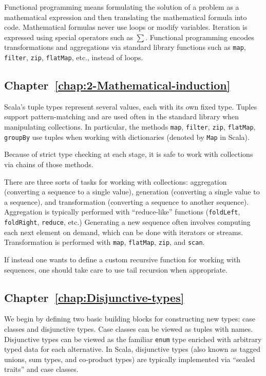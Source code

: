 Functional programming means formulating the solution of a problem
as a mathematical expression and then translating the mathematical
formula into code. Mathematical formulas never use loops or modify
variables. Iteration is expressed using special operators such as
$\sum$. Functional programming encodes transformations and aggregations
via standard library functions such as \lstinline!map!, \lstinline!filter!,
\lstinline!zip!, \lstinline!flatMap!, etc., instead of loops.

\subsection{Chapter~\ref{chap:2-Mathematical-induction}}

Scala\textsf{'}s tuple types represent several values, each with its own fixed
type. Tuples support pattern-matching and are used often in the standard
library when manipulating collections. In particular, the methods
\lstinline!map!, \lstinline!filter!, \lstinline!zip!, \lstinline!flatMap!,
\lstinline!groupBy! use tuples when working with dictionaries (denoted
by \lstinline!Map! in Scala).

Because of strict type checking at each stage, it is safe to work
with collections via chains of those methods.

There are three sorts of tasks for working with collections: aggregation
(converting a sequence to a single value), generation (converting
a single value to a sequence), and transformation (converting a sequence
to another sequence). Aggregation is typically performed with \textsf{``}reduce-like\textsf{''}
functions (\lstinline!foldLeft!, \lstinline!foldRight!, \lstinline!reduce!,
etc.) Generating a new sequence often involves computing each next
element on demand, which can be done with iterators or streams. Transformation
is performed with \lstinline!map!, \lstinline!flatMap!, \lstinline!zip!,
and \lstinline!scan!.

If instead one wants to define a custom recursive function for working
with sequences, one should take care to use tail recursion when appropriate.

\subsection{Chapter~\ref{chap:Disjunctive-types}}

We begin by defining two basic building blocks for constructing new
types: case classes and disjunctive types. Case classes can be viewed
as tuples with names. Disjunctive types can be viewed as the familiar
\lstinline!enum! type enriched with arbitrary typed data for each
alternative. In Scala, disjunctive types (also known as tagged unions,
sum types, and co-product types) are typically implemented via \textsf{``}sealed
traits\textsf{''} and case classes.

